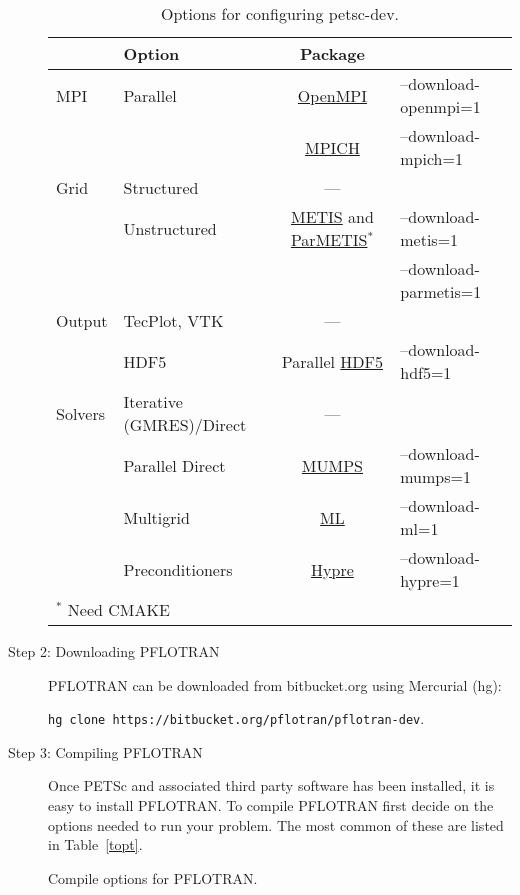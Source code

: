\begin{description}
\begin{table}[H]\centering
\caption{Options for configuring petsc-dev.}
\label{tinstall}

\vspace{3mm}

\begin{tabular}{llcl}
\toprule
& Option & Package\\
\midrule
MPI & Parallel & \href{http://www.open-mpi.org/}{OpenMPI} & --download-openmpi=1\\
&& \href{http://www.mpich.org/}{MPICH} &--download-mpich=1\\
\midrule
Grid & Structured & ---\\
& Unstructured & \href{http://glaros.dtc.umn.edu/gkhome/views/metis}{METIS} and \href{http://glaros.dtc.umn.edu/gkhome/views/metis}{ParMETIS}$^*$ & --download-metis=1\\
&&& --download-parmetis=1\\
\midrule
Output & TecPlot, VTK & ---\\
& HDF5 & Parallel \href{http://www.hdfgroup.org/HDF5/}{HDF5} & --download-hdf5=1\\
\midrule
Solvers & Iterative (GMRES)/Direct & ---\\
& Parallel Direct & \href{http://graal.ens-lyon.fr/MUMPS/}{MUMPS} & --download-mumps=1\\
& Multigrid & \href{http://trilinos.sandia.gov/packages/ml/}{ML} & --download-ml=1\\
& Preconditioners & \href{http://acts.nersc.gov/hypre/}{Hypre} & --download-hypre=1\\
\bottomrule
\multicolumn{2}{l}{$^*$ Need CMAKE}
\end{tabular}
\end{table}

\item[Step 2: Downloading PFLOTRAN] PFLOTRAN can be downloaded from bitbucket.org using Mercurial (hg):

{\footnotesize\tt hg clone https://bitbucket.org/pflotran/pflotran-dev}.

\item[Step 3: Compiling PFLOTRAN] Once PETSc and associated third party software has been installed, it is easy to install PFLOTRAN. To compile PFLOTRAN first decide on the options needed to run your problem. The most common of these are listed in Table~\ref{topt}.

\begin{table}[H]\centering
\caption{Compile options for PFLOTRAN.}


\end{table}
\end{description}
